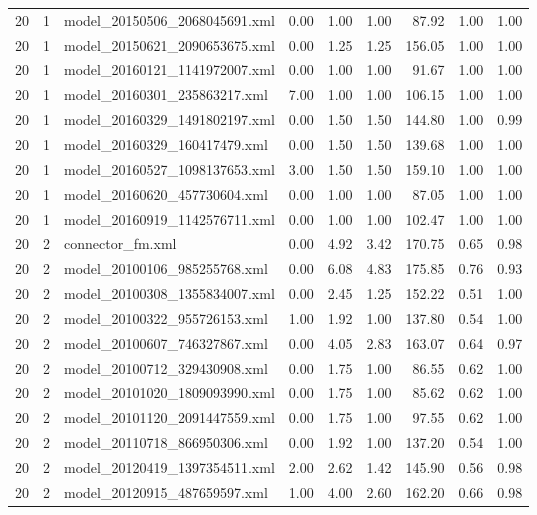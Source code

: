 \begin{table}[ht]
\begin{tabular}{rrlrrrrrr}
   20 &   1 & model\_20150506\_2068045691.xml & 0.00 & 1.00 & 1.00 & 87.92 & 1.00 & 1.00 \\ 
   20 &   1 & model\_20150621\_2090653675.xml & 0.00 & 1.25 & 1.25 & 156.05 & 1.00 & 1.00 \\ 
   20 &   1 & model\_20160121\_1141972007.xml & 0.00 & 1.00 & 1.00 & 91.67 & 1.00 & 1.00 \\ 
   20 &   1 & model\_20160301\_235863217.xml & 7.00 & 1.00 & 1.00 & 106.15 & 1.00 & 1.00 \\ 
   20 &   1 & model\_20160329\_1491802197.xml & 0.00 & 1.50 & 1.50 & 144.80 & 1.00 & 0.99 \\ 
   20 &   1 & model\_20160329\_160417479.xml & 0.00 & 1.50 & 1.50 & 139.68 & 1.00 & 1.00 \\ 
   20 &   1 & model\_20160527\_1098137653.xml & 3.00 & 1.50 & 1.50 & 159.10 & 1.00 & 1.00 \\ 
   20 &   1 & model\_20160620\_457730604.xml & 0.00 & 1.00 & 1.00 & 87.05 & 1.00 & 1.00 \\ 
   20 &   1 & model\_20160919\_1142576711.xml & 0.00 & 1.00 & 1.00 & 102.47 & 1.00 & 1.00 \\ 
   20 &   2 & connector\_fm.xml & 0.00 & 4.92 & 3.42 & 170.75 & 0.65 & 0.98 \\ 
   20 &   2 & model\_20100106\_985255768.xml & 0.00 & 6.08 & 4.83 & 175.85 & 0.76 & 0.93 \\ 
   20 &   2 & model\_20100308\_1355834007.xml & 0.00 & 2.45 & 1.25 & 152.22 & 0.51 & 1.00 \\ 
   20 &   2 & model\_20100322\_955726153.xml & 1.00 & 1.92 & 1.00 & 137.80 & 0.54 & 1.00 \\ 
   20 &   2 & model\_20100607\_746327867.xml & 0.00 & 4.05 & 2.83 & 163.07 & 0.64 & 0.97 \\ 
   20 &   2 & model\_20100712\_329430908.xml & 0.00 & 1.75 & 1.00 & 86.55 & 0.62 & 1.00 \\ 
   20 &   2 & model\_20101020\_1809093990.xml & 0.00 & 1.75 & 1.00 & 85.62 & 0.62 & 1.00 \\ 
   20 &   2 & model\_20101120\_2091447559.xml & 0.00 & 1.75 & 1.00 & 97.55 & 0.62 & 1.00 \\ 
   20 &   2 & model\_20110718\_866950306.xml & 0.00 & 1.92 & 1.00 & 137.20 & 0.54 & 1.00 \\ 
   20 &   2 & model\_20120419\_1397354511.xml & 2.00 & 2.62 & 1.42 & 145.90 & 0.56 & 0.98 \\ 
   20 &   2 & model\_20120915\_487659597.xml & 1.00 & 4.00 & 2.60 & 162.20 & 0.66 & 0.98 \\ 

\end{tabular}
\end{table}
